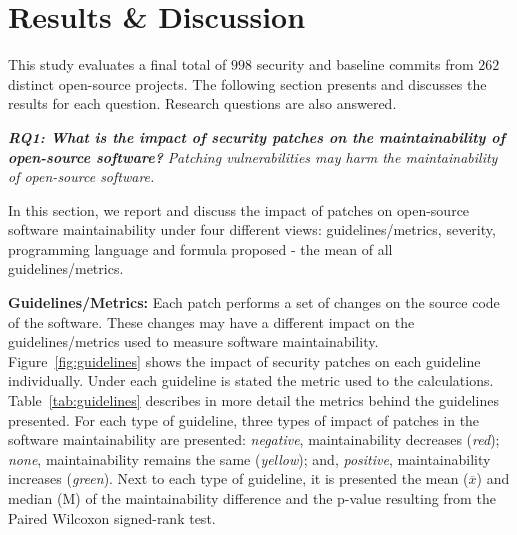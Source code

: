 \documentclass[10pt,conference]{IEEEtran}
\begin{document}
\section{Results \& Discussion}\label{sec:results}

This study evaluates a final total of $998$ security and baseline commits 
from $262$ distinct open-source projects. The following section presents and 
discusses the results for each question. Research questions are also answered.

\textit{\textbf{RQ1: What is the impact of security patches on the
maintainability of open-source software?}}
\textit{Patching vulnerabilities may harm the maintainability of open-source
software.}

In this section, we report and discuss the impact of patches on open-source
software maintainability under four different views: guidelines/metrics, 
severity, programming language and formula proposed - the mean of all 
guidelines/metrics.


\textbf{Guidelines/Metrics:} Each patch performs a set of changes
on the source code of the software. These changes may have a different
impact on the guidelines/metrics used to measure software maintainability. 
Figure~\ref{fig:guidelines} shows the impact of security patches 
on each guideline individually. Under each guideline is stated the 
metric used to the calculations. Table~\ref{tab:guidelines} describes 
in more detail the metrics behind the guidelines presented. 
For each type of guideline, three types of impact of patches in 
the software maintainability are presented: 
\emph{negative}, maintainability decreases (\emph{red});
\emph{none}, maintainability remains the same (\emph{yellow}); and,
\emph{positive}, maintainability increases (\emph{green}). Next to each
type of guideline, it is presented the mean ($\overline{x}$) and median (M)
of the maintainability difference and the p-value resulting from the
Paired Wilcoxon signed-rank test.
\end{document}
